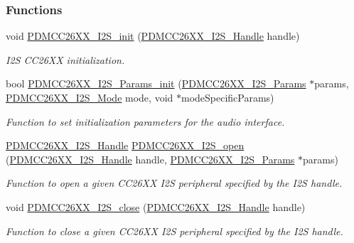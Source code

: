 \subsubsection*{Functions}
\begin{DoxyCompactItemize}
\item 
void \hyperlink{_p_d_m_c_c26_x_x__util_8h_af19da786c201c7c1852177a92f851158}{P\+D\+M\+C\+C26\+X\+X\+\_\+\+I2\+S\+\_\+init} (\hyperlink{_p_d_m_c_c26_x_x__util_8h_adc3b274b4a54e54316ad385fd4290c80}{P\+D\+M\+C\+C26\+X\+X\+\_\+\+I2\+S\+\_\+\+Handle} handle)
\begin{DoxyCompactList}\small\item\em I2\+S C\+C26\+X\+X initialization. \end{DoxyCompactList}\item 
bool \hyperlink{_p_d_m_c_c26_x_x__util_8h_a4b0ca4428ed47e11d7280d98dd7f46e5}{P\+D\+M\+C\+C26\+X\+X\+\_\+\+I2\+S\+\_\+\+Params\+\_\+init} (\hyperlink{struct_p_d_m_c_c26_x_x___i2_s___params}{P\+D\+M\+C\+C26\+X\+X\+\_\+\+I2\+S\+\_\+\+Params} $\ast$params, \hyperlink{_p_d_m_c_c26_x_x__util_8h_a7392b654a84f42e717a4df1485058a84}{P\+D\+M\+C\+C26\+X\+X\+\_\+\+I2\+S\+\_\+\+Mode} mode, void $\ast$mode\+Specific\+Params)
\begin{DoxyCompactList}\small\item\em Function to set initialization parameters for the audio interface. \end{DoxyCompactList}\item 
\hyperlink{_p_d_m_c_c26_x_x__util_8h_adc3b274b4a54e54316ad385fd4290c80}{P\+D\+M\+C\+C26\+X\+X\+\_\+\+I2\+S\+\_\+\+Handle} \hyperlink{_p_d_m_c_c26_x_x__util_8h_a8168bcdab9f1e46c26823555df6f797f}{P\+D\+M\+C\+C26\+X\+X\+\_\+\+I2\+S\+\_\+open} (\hyperlink{_p_d_m_c_c26_x_x__util_8h_adc3b274b4a54e54316ad385fd4290c80}{P\+D\+M\+C\+C26\+X\+X\+\_\+\+I2\+S\+\_\+\+Handle} handle, \hyperlink{struct_p_d_m_c_c26_x_x___i2_s___params}{P\+D\+M\+C\+C26\+X\+X\+\_\+\+I2\+S\+\_\+\+Params} $\ast$params)
\begin{DoxyCompactList}\small\item\em Function to open a given C\+C26\+X\+X I2\+S peripheral specified by the I2\+S handle. \end{DoxyCompactList}\item 
void \hyperlink{_p_d_m_c_c26_x_x__util_8h_a6c337d78b6c364ca580cfcb86176c35a}{P\+D\+M\+C\+C26\+X\+X\+\_\+\+I2\+S\+\_\+close} (\hyperlink{_p_d_m_c_c26_x_x__util_8h_adc3b274b4a54e54316ad385fd4290c80}{P\+D\+M\+C\+C26\+X\+X\+\_\+\+I2\+S\+\_\+\+Handle} handle)
\begin{DoxyCompactList}\small\item\em Function to close a given C\+C26\+X\+X I2\+S peripheral specified by the I2\+S handle. \end{DoxyCompactList}\item 

\end{DoxyCompactItemize}
